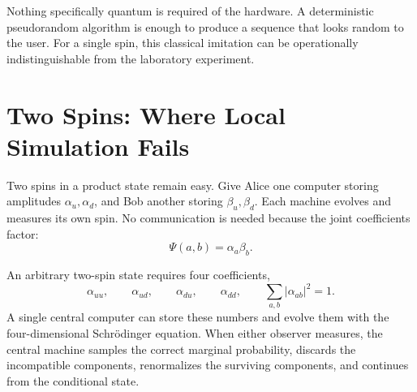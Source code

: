 Nothing specifically quantum is required of the hardware. A deterministic pseudorandom algorithm is enough to produce a sequence that looks random to the user. For a single spin, this classical imitation can be operationally indistinguishable from the laboratory experiment.

\begin{classroomqa}
\end{classroomqa}

\begin{classroomqa}
\end{classroomqa}

\section{Two Spins: Where Local Simulation Fails}

Two spins in a product state remain easy. Give Alice one computer storing amplitudes \(\alpha_u,\alpha_d\), and Bob another storing \(\beta_u,\beta_d\). Each machine evolves and measures its own spin. No communication is needed because the joint coefficients factor:
\begin{equation}
\Psi(a,b)=\alpha_a\beta_b.
\end{equation}

An arbitrary two-spin state requires four coefficients,
\begin{equation}
\alpha_{uu},\qquad
\alpha_{ud},\qquad
\alpha_{du},\qquad
\alpha_{dd},
\qquad
\sum_{a,b}|\alpha_{ab}|^2=1.
\label{eq:l8-four-amplitudes}
\end{equation}
A single central computer can store these numbers and evolve them with the four-dimensional Schr\"odinger equation. When either observer measures, the central machine samples the correct marginal probability, discards the incompatible components, renormalizes the surviving components, and continues from the conditional state.

